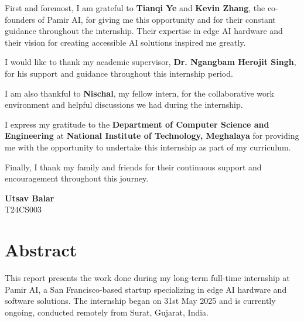 \documentclass[12pt,a4paper]{report}
\begin{document}
\vspace{0.5cm}

First and foremost, I am grateful to \textbf{Tianqi Ye} and \textbf{Kevin Zhang}, the co-founders of Pamir AI, for giving me this opportunity and for their constant guidance throughout the internship. Their expertise in edge AI hardware and their vision for creating accessible AI solutions inspired me greatly.

\vspace{0.5cm}

I would like to thank my academic supervisor, \textbf{Dr. Ngangbam Herojit Singh}, for his support and guidance throughout this internship period.

\vspace{0.5cm}

I am also thankful to \textbf{Nischal}, my fellow intern, for the collaborative work environment and helpful discussions we had during the internship.

\vspace{0.5cm}

I express my gratitude to the \textbf{Department of Computer Science and Engineering} at \textbf{National Institute of Technology, Meghalaya} for providing me with the opportunity to undertake this internship as part of my curriculum.

\vspace{0.5cm}

Finally, I thank my family and friends for their continuous support and encouragement throughout this journey.

\vspace{2cm}

\begin{flushright}
\textbf{Utsav Balar} \\
T24CS003
\end{flushright}

\newpage
\chapter*{Abstract}

\vspace{1cm}

This report presents the work done during my long-term full-time internship at Pamir AI, a San Francisco-based startup specializing in edge AI hardware and software solutions. The internship began on 31st May 2025 and is currently ongoing, conducted remotely from Surat, Gujarat, India.
\end{document}
